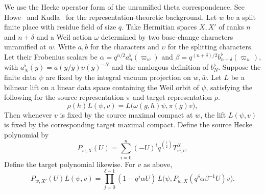 \begin{lemma}
\label{lem:a-unramified-pairing-hecke}
\emitthmsource
We use the Hecke operator form of the unramified theta correspondence. See Howe~\cite{Howe1979} and Kudla~\cite{Kudla1986} for the representation-theoretic background. Let $w$ be a split finite place with residue field of size $q$. Take Hermitian spaces $X,X'$ of ranks $n$ and $n+\delta$ and a Weil action $\omega$ determined by two base-change characters unramified at $w$. Write $a,b$ for the characters and $\upsilon$ for the splitting characters. Let their Frobenius scalars be $\alpha=q^{n/2}a^\flat_n(\varpi_w)$ and $\beta=q^{(n+\delta)/2}b^\flat_{n+\delta}(\varpi_w)$, with $a^\flat_N(y)=a(y/\bar y)\upsilon(y)^{-N}$ and the analogous definition of $b^\flat_N$. Suppose the finite data $\psi$ are fixed by the integral vacuum projection on $w,\bar w$. Let $L$ be a bilinear lift on a linear data space containing the Weil orbit of $\psi$, satisfying the following for the source representation $\pi$ and target representation $\rho$.
\[
 \rho(h)L(\psi,v)=L\bigl(\omega(g,h)\psi,\pi(g)v\bigr),
\]
Then whenever $v$ is fixed by the source maximal compact at $w$, the lift $L(\psi,v)$ is fixed by the corresponding target maximal compact. Define the source Hecke polynomial by
\[
 P_{w,X}(U)=\sum_{i=0}^{n}(-U)^i q^{\binom i2}T_{w,i}^{X},
\]
Define the target polynomial likewise. For $v$ as above,
\[
 P_{w,X'}(U)L(\psi,v)=
 \prod_{j=0}^{\delta-1}(1-q^j\alpha U)\,
 L\bigl(\psi,P_{w,X}(q^\delta\alpha\beta^{-1}U)v\bigr).
\]
\end{lemma}
